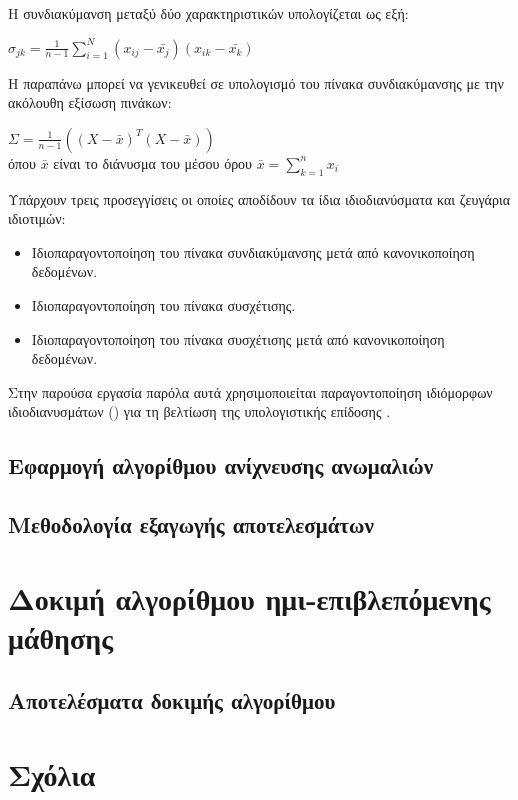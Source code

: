 Η συνδιακύμανση μεταξύ δύο χαρακτηριστικών υπολογίζεται ως εξή:
\begin{center}
$\sigma_{jk}=\frac{1}{n-1}\sum_{i=1}^N(x_{ij}-\bar{x_j})(x_{ik}-\bar{x_k})$
\end{center}
Η παραπάνω μπορεί να γενικευθεί σε υπολογισμό του πίνακα συνδιακύμανσης με την ακόλουθη εξίσωση πινάκων:
\begin{center}
$\Sigma=\frac{1}{n-1}((X-\bar{x})^T(X-\bar{x}))$\\
όπου $\bar{x}$ είναι το διάνυσμα του μέσου όρου $\bar{x}=\sum_{k=1}^nx_i$
\end{center}
Υπάρχουν τρεις προσεγγίσεις οι οποίες αποδίδουν τα ίδια ιδιοδιανύσματα και ζευγάρια ιδιοτιμών:
\begin{itemize}
\item Ιδιοπαραγοντοποίηση του πίνακα συνδιακύμανσης μετά από κανονικοποίηση δεδομένων.
\item Ιδιοπαραγοντοποίηση του πίνακα συσχέτισης.
\item Ιδιοπαραγοντοποίηση του πίνακα συσχέτισης μετά από κανονικοποίηση δεδομένων.
\end{itemize}
Στην παρούσα εργασία παρόλα αυτά χρησιμοποιείται παραγοντοποίηση ιδιόμορφων ιδιοδιανυσμάτων () για τη βελτίωση της υπολογιστικής επίδοσης \cite{Plotly}.
\subsection{Εφαρμογή αλγορίθμου ανίχνευσης ανωμαλιών}
\subsection{Μεθοδολογία εξαγωγής αποτελεσμάτων}
\section{Δοκιμή αλγορίθμου ημι-επιβλεπόμενης μάθησης}
\subsection{Αποτελέσματα δοκιμής αλγορίθμου}
\section{Σχόλια}